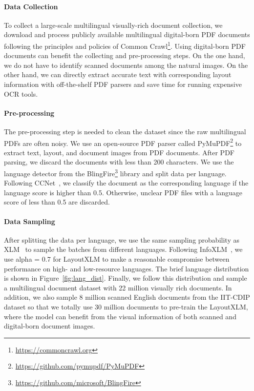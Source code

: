 \documentclass[11pt]{article}
\begin{document}
\paragraph{Data Collection}


To collect a large-scale multilingual visually-rich document collection, we download and process publicly available multilingual digital-born PDF documents following the principles and policies of Common Crawl\footnote{\url{https://commoncrawl.org}}. Using digital-born PDF documents can benefit the collecting and pre-processing steps. On the one hand, we do not have to identify scanned documents among the natural images. On the other hand, we can directly extract accurate text with corresponding layout information with off-the-shelf PDF parsers and save time for running expensive OCR tools. \paragraph{Pre-processing}
The pre-processing step is needed to clean the dataset since the raw multilingual PDFs are often noisy. We use an open-source PDF parser called PyMuPDF\footnote{\url{https://github.com/pymupdf/PyMuPDF}} to extract text, layout, and document images from PDF documents. After PDF parsing, we discard the documents with less than 200 characters. We use the language detector from the BlingFire\footnote{\url{https://github.com/microsoft/BlingFire}} library and split data per language. Following CCNet~\citep{DBLP:journals/corr/abs-1911-00359}, we classify the document as the corresponding language if the language score is higher than 0.5. Otherwise, unclear PDF files with a language score of less than 0.5 are discarded.

\paragraph{Data Sampling}
After splitting the data per language, we use the same sampling probability  as XLM~\cite{lample2019crosslingual} to sample the batches from different languages. Following InfoXLM~\citep{chi2020infoxlm}, we use alpha = 0.7 for LayoutXLM to make a reasonable compromise between performance on high- and low-resource languages. The brief language distribution is shown in Figure~\ref{fig:lang_dist}. Finally, we follow this distribution and sample a multilingual document dataset with 22 million visually rich documents. In addition, we also sample 8 million scanned English documents from the IIT-CDIP dataset so that we totally use 30 million documents to pre-train the LayoutXLM, where the model can benefit from the visual information of both scanned and digital-born document images.
\end{document}
